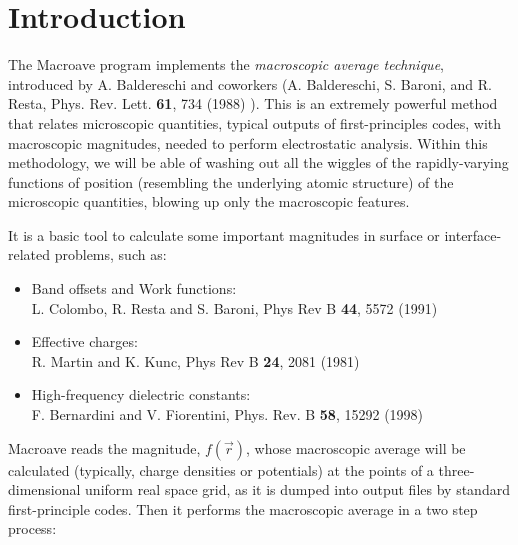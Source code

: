 \tableofcontents

\newpage



\section{Introduction}
\label{sec:intro}

 The {\sc Macroave} program implements
 the {\it macroscopic average technique},
 introduced by A. Baldereschi and coworkers
 (A. Baldereschi, S. Baroni, and R. Resta,
 Phys. Rev. Lett. {\bf 61}, 734 (1988) ).
 This is an extremely powerful method that relates
 microscopic quantities, typical outputs of first-principles codes,
 with macroscopic magnitudes,
 needed to perform electrostatic analysis.
 Within this methodology, we will be able of washing out all the
 wiggles of the rapidly-varying functions of position (resembling
 the underlying atomic structure) of the microscopic quantities,
 blowing up only the macroscopic features.

 It is a basic tool to calculate some important magnitudes in
 surface or interface-related problems, such as:

 \begin{itemize}
    \item Band offsets and Work functions: \\
          L. Colombo, R. Resta and S. Baroni, Phys Rev B  {\bf 44}, 5572 (1991)
    \item Effective charges: \\
          R. Martin and K. Kunc,  Phys Rev B  {\bf 24}, 2081 (1981)
    \item High-frequency dielectric constants: \\
          F. Bernardini and V. Fiorentini, Phys. Rev. B {\bf 58}, 15292 (1998)
 \end{itemize}

 {\sc Macroave} reads the magnitude, $f \left( \vec{r} \right)$,
 whose macroscopic average will be calculated
 (typically, charge densities or potentials)
 at the points of a three-dimensional uniform real space grid,
 as it is dumped into output files by standard first-principle codes.
 Then it performs the macroscopic average in a two step process:

